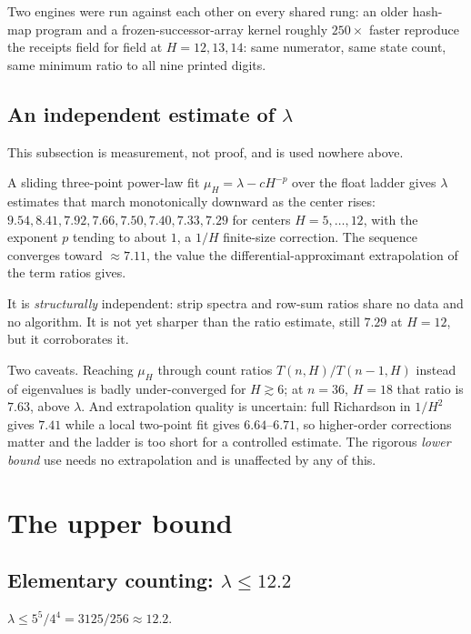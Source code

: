 \documentclass[11pt]{article}
\begin{document}
Two engines were run against each other on every shared rung: an older hash-map
program and a frozen-successor-array kernel roughly $250\times$ faster reproduce
the receipts field for field at $H = 12, 13, 14$: same numerator, same state
count, same minimum ratio to all nine printed digits.

\subsection{An independent estimate of \texorpdfstring{$\lambda$}{lambda}}
\label{sec:estimate}

This subsection is measurement, not proof, and is used nowhere above.

A sliding three-point power-law fit $\mu_H = \lambda - cH^{-p}$ over the float
ladder gives $\lambda$ estimates that march monotonically downward as the center
rises: $9.54, 8.41, 7.92, 7.66, 7.50, 7.40, 7.33, 7.29$ for centers
$H = 5,\dots,12$, with the exponent $p$ tending to about $1$, a $1/H$
finite-size correction. The sequence converges toward $\approx 7.11$, the value the
differential-approximant extrapolation of the term ratios gives.

It is \emph{structurally} independent: strip spectra
and row-sum ratios share no data and no algorithm. It is not yet sharper than the
ratio estimate, still $7.29$ at $H = 12$, but it corroborates it.

Two caveats. Reaching $\mu_H$ through count ratios
$T(n,H)/T(n-1,H)$ instead of eigenvalues is badly under-converged for
$H \gtrsim 6$; at $n = 36$, $H = 18$ that ratio is $7.63$, above $\lambda$. And
extrapolation quality is uncertain: full Richardson in $1/H^2$ gives
$7.41$ while a local two-point fit gives $6.64$--$6.71$, so higher-order
corrections matter and the ladder is too short for a controlled estimate. The
rigorous \emph{lower bound} use needs no extrapolation and is unaffected by any
of this.

\section{The upper bound}
\label{sec:upper}

\subsection{Elementary counting: \texorpdfstring{$\lambda \le 12.2$}{lambda <= 12.2}}
\label{sec:crudebound}

\begin{proposition}
\label{prop:crude}
$\lambda \le 5^5/4^4 = 3125/256 \approx 12.2$.
\end{proposition}
\end{document}
